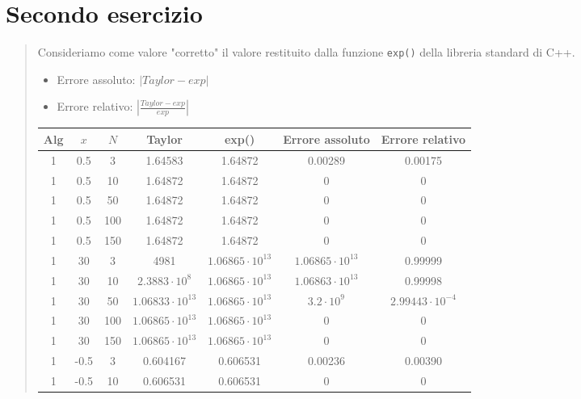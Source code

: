 \documentclass[10pt]{article}
\begin{document}
\section{Secondo esercizio}
\begin{quote}
    Consideriamo come valore "corretto" il valore restituito dalla funzione \texttt{exp()} della libreria standard di C++.
    \begin{itemize}
        \item Errore assoluto: $|Taylor-exp|$
        \item Errore relativo: $\left |\frac{Taylor-exp}{exp}\right |$
    \end{itemize}
    \begin{center}
        \begin{tabular}{| c | c | c | c | c | c | c |}
            \hline
            \textbf{Alg} & \textbf{$x$} & \textbf{$N$} & \textbf{Taylor} & \textbf{exp()} & \textbf{Errore assoluto} & \textbf{Errore relativo}\\
            \hline
            1 & 0.5 & 3 & 1.64583 & 1.64872 & 0.00289 & 0.00175 \\
            \hline
            1 & 0.5 & 10 & 1.64872 & 1.64872 & 0 & 0 \\
            \hline
            1 & 0.5 & 50 & 1.64872 & 1.64872 & 0 & 0 \\
            \hline 
            1 & 0.5 & 100 & 1.64872 & 1.64872 & 0 & 0 \\
            \hline
            1 & 0.5 & 150 & 1.64872 & 1.64872 & 0 & 0 \\
            \hline
            1 & 30 & 3 & 4981 & $1.06865\cdot10^{13}$ & $1.06865\cdot10^{13}$ & 0.99999 \\
            \hline
            1 & 30 & 10 & $2.3883\cdot10^{8}$ & $1.06865\cdot10^{13}$ & $1.06863\cdot10^{13}$ & 0.99998 \\
            \hline
            1 & 30 & 50 & $1.06833\cdot10^{13}$ & $1.06865\cdot10^{13}$ & $3.2\cdot10^{9}$ & $2.99443\cdot10^{-4}$ \\
            \hline
            1 & 30 & 100 & $1.06865\cdot10^{13}$ & $1.06865\cdot10^{13}$ & 0 & 0 \\
            \hline
            1 & 30 & 150 & $1.06865\cdot10^{13}$ & $1.06865\cdot10^{13}$ & 0 & 0 \\
            \hline
            1 & -0.5 & 3 & 0.604167 & 0.606531 & 0.00236 & 0.00390 \\
            \hline
            1 & -0.5 & 10 & 0.606531 & 0.606531 & 0 & 0 \\

\end{tabular}
\end{center}
\end{quote}
\end{document}
